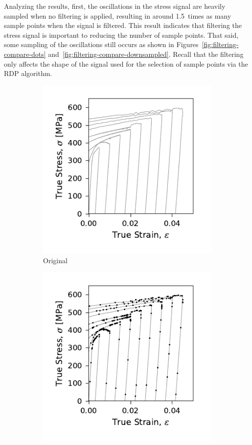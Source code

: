 \documentclass[a4paper,11pt]{article}
\begin{document}
Analyzing the results, first, the oscillations in the stress signal are heavily sampled when no filtering is applied, resulting in around 1.5~times as many sample points when the signal is filtered.
This result indicates that filtering the stress signal is important to reducing the number of sample points.
That said, some sampling of the oscillations still occurs as shown in Figures~\ref{fig:filtering-compare-dots} and~\ref{fig:filtering-compare-downsampled}.
Recall that the filtering only affects the shape of the signal used for the selection of sample points via the RDP algorithm.


\begin{figure}
    \centering
    \begin{subfigure}[b]{0.49\linewidth}
        \centering
        \includegraphics{LP6_dots_WP3_IPE360_C_CRM8_nodots_.pdf}
        \caption{Original}
    \end{subfigure}
    \begin{subfigure}[b]{0.49\linewidth}
        \centering
        \includegraphics{LP6_dots_WP3_IPE360_C_CRM8_op3_.pdf}

\end{subfigure}
\end{figure}
\end{document}
